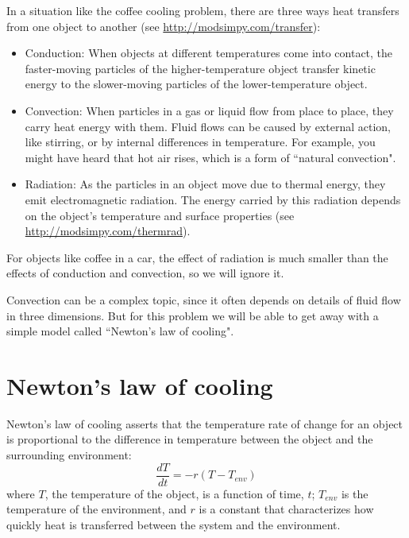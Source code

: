 \documentclass[12pt]{book}
\theoremstyle{exercise}
\begin{document}
In a situation like the coffee cooling problem, there are three ways heat transfers from one object to another (see \url{http://modsimpy.com/transfer}):


\begin{itemize}

\item Conduction: When objects at different temperatures come into contact, the faster-moving particles of the higher-temperature object transfer kinetic energy to the slower-moving particles of the lower-temperature object.

\item Convection: When particles in a gas or liquid flow from place to place, they carry heat energy with them.  Fluid flows can be caused by external action, like stirring, or by internal differences in temperature.  For example, you might have heard that hot air rises, which is a form of ``natural convection".


\item Radiation: As the particles in an object move due to thermal energy, they emit electromagnetic radiation.  The energy carried by this radiation depends on the object's temperature and surface properties (see \url{http://modsimpy.com/thermrad}).

\end{itemize}

For objects like coffee in a car, the effect of radiation is much smaller than the effects of conduction and convection, so we will ignore it.

Convection can be a complex topic, since it often depends on details of fluid flow in three dimensions.  But for this problem we will be able to get away with a simple model called ``Newton's law of cooling".


\section{Newton's law of cooling}

Newton's law of cooling asserts that the temperature rate of change for an object is proportional to the difference in temperature between the object and the surrounding environment:
%
\[ \frac{dT}{dt} = -r (T - T_{env}) \]
%
where $T$, the temperature of the object, is a function of time, $t$; $T_{env}$ is the temperature of the environment, and $r$ is a constant that characterizes how quickly heat is transferred between the system and the environment.
\end{document}
